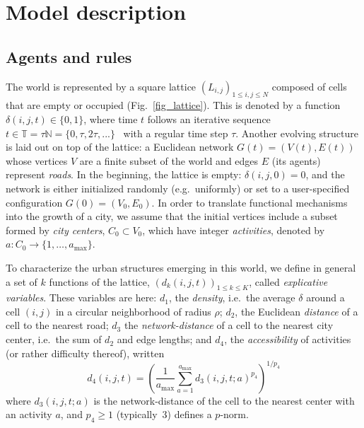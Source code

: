 
\section{Model description} \label{sec_model}

\subsection{Agents and rules}

The world is represented by a square lattice $(L_{i,j})_{1\leq i,j\leq N}$ composed of cells that are empty or occupied (Fig.~\ref{fig_lattice}). This is denoted by a function $\delta(i,j,t)\in\{0,1\}$, where time $t$ follows an iterative sequence $t\in\mathbb{T} = \tau\mathbb{N} = \{0, \tau, 2\tau, ...\}$~\cite{golden2012modeling} with a regular time step $\tau$. Another evolving structure is laid out on top of the lattice: a Euclidean network $G(t)=(V(t),E(t))$ whose vertices $V$ are a finite subset of the world and edges $E$ (its agents) represent \emph{roads}. In the beginning, the lattice is empty: $\delta(i,j,0)=0$, and the network is either initialized randomly (e.g.~uniformly) or set to a user-specified configuration $G(0)=(V_0,E_0)$. In order to translate functional mechanisms into the growth of a city, we assume that the initial vertices include a subset formed by \emph{city centers}, $C_0\subset V_0$, which have integer \emph{activities}, denoted by $a:C_0\rightarrow\{1,\ldots,a_{\max}\}$.

To characterize the urban structures emerging in this world, we define in general a set of $k$ functions of the lattice, $(d_k(i,j,t))_{1\leq k\leq K}$, called \emph{explicative variables}. These variables are here: $d_1$, the \emph{density}, i.e.~the average $\delta$ around a cell $(i,j)$ in a circular neighborhood of radius $\rho$; $d_2$, the Euclidean \emph{distance} of a cell to the nearest road; $d_3$ the \emph{network-distance} of a cell to the nearest city center, i.e.~the sum of $d_2$ and edge lengths; and $d_4$, the \emph{accessibility} of activities (or rather difficulty thereof), written
%
\begin{equation}
d_4(i,j,t)=\left(\frac{1}{a_{\max}}\sum_{a=1}^{a_{\max}}d_3(i,j,t;a)^{p_4}\right)^{1/p_4}
\end{equation}
%
where $d_3(i,j,t;a)$ is the network-distance of the cell to the nearest center with an activity $a$, and $p_4\geq1$ (typically~3) defines a $p$-norm.

